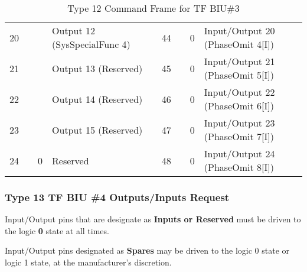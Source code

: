 \documentclass[]{article}
\begin{document}
\begin{landscape}
\begin{table}[]
\begin{tabular}{lllllllll}
			20           &                    &                   & Output 12 (SysSpecialFunc 4)  &                   & 44  &                    & 0                 & Input/Output 20 (PhaseOmit 4{[}I{]})   \\
			21           &                    &                   & Output 13 (Reserved)          &                   & 45  &                    & 0                 & Input/Output 21 (PhaseOmit 5{[}I{]})   \\
			22           &                    &                   & Output 14 (Reserved)          &                   & 46  &                    & 0                 & Input/Output 22 (PhaseOmit 6{[}I{]})   \\
			23           &                    &                   & Output 15 (Reserved)          &                   & 47  &                    & 0                 & Input/Output 23 (PhaseOmit 7{[}I{]})   \\ \cline{3-4}
			24           &                    & 0                 & Reserved                      &                   & 48  &                    & 0                 & Input/Output 24 (PhaseOmit 8{[}I{]})   \\ \cline{1-4} \cline{6-9} 
		\end{tabular}
		\caption{Type 12 Command Frame for TF BIU\#3}
		\label{tab:type-12-frame}
	\end{table}
\end{landscape}

\clearpage
\subsubsection {Type 13 TF BIU \#4 Outputs/Inputs Request}

Input/Output pins that are designate as \textbf{Inputs or Reserved} must be driven to the logic \textbf{0} state at all times.

Input/Output pins designated as \textbf{Spares} may be driven to the logic 0 state or logic 1 state, at the manufacturer's discretion.
\end{document}
